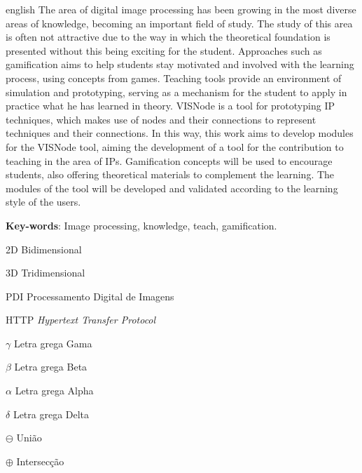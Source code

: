 \documentclass[
	12pt,				%
	oneside,			%
	a4paper,			%
	english,			%
	french,				%
	spanish,			%
	brazil,				%
	]{abntex2}
\begin{document}
\begin{resumo}[ABSTRACT]
 \begin{otherlanguage*}{english}
The area of digital image processing has been growing in the most diverse areas of knowledge, becoming an important field of study. The study of this area is often not attractive due to the way in which the theoretical foundation is presented without this being exciting for the student. Approaches such as gamification aims to help students stay motivated and involved with the learning process, using concepts from games. Teaching tools provide an environment of simulation and prototyping, serving as a mechanism for the student to apply in practice what he has learned in theory. VISNode is a tool for prototyping IP techniques, which makes use of nodes and their connections to represent techniques and their connections. In this way, this work aims to develop modules for the VISNode tool, aiming the development of a tool for the contribution to teaching in the area of IPs. Gamification concepts will be used to encourage students, also offering theoretical materials to complement the learning. The modules of the tool will be developed and validated according to the learning style of the users.

   \vspace{\onelineskip}
 
   \noindent 
   \textbf{Key-words}: Image processing, knowledge, teach, gamification.
 \end{otherlanguage*}
\end{resumo}


\listoffigures*
\cleardoublepage

\listoftables*
\cleardoublepage

\begin{siglas}
  \item[2D] Bidimensional
  \item[3D] Tridimensional
  \item[PDI] Processamento Digital de Imagens
  \item[HTTP] \textit{Hypertext Transfer Protocol}
\end{siglas}

\begin{simbolos}
  \item[$ \gamma $] Letra grega Gama
  \item[$ \beta $] Letra grega Beta
  \item[$ \alpha $] Letra grega Alpha
  \item[$ \delta $] Letra grega Delta
  \item[$ \ominus $] União
  \item[$ \oplus $] Intersecção
  
\end{simbolos}
\end{document}
